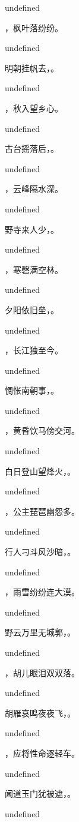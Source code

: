 \documentclass[12pt, a4paper, addpoints]{exam}
\begin{document}
\begin{questions}
undefined

\question[3] \fillin，枫叶落纷纷。

undefined

\question[3] 明朝挂帆去，\fillin。

undefined

\question[3] \fillin，秋入望乡心。

undefined

\question[3] 古台摇落后，\fillin。

undefined

\question[3] \fillin，云峰隔水深。

undefined

\question[3] 野寺来人少，\fillin。

undefined

\question[3] \fillin，寒磬满空林。

undefined

\question[3] 夕阳依旧垒，\fillin。

undefined

\question[3] \fillin，长江独至今。

undefined

\question[3] 惆怅南朝事，\fillin。

undefined

\question[3] \fillin，黄昏饮马傍交河。

undefined

\question[3] 白日登山望烽火，\fillin。

undefined

\question[3] \fillin，公主琵琶幽怨多。

undefined

\question[3] 行人刁斗风沙暗，\fillin。

undefined

\question[3] \fillin，雨雪纷纷连大漠。

undefined

\question[3] 野云万里无城郭，\fillin。

undefined

\question[3] \fillin，胡儿眼泪双双落。

undefined

\question[3] 胡雁哀鸣夜夜飞，\fillin。

undefined

\question[3] \fillin，应将性命逐轻车。

undefined

\question[3] 闻道玉门犹被遮，\fillin。

undefined


\end{questions}
\end{document}
